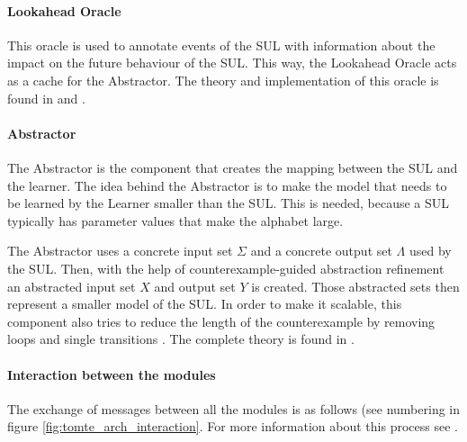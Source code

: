\documentclass[multi,crop=false,class=article]{standalone}
\begin{document}
\paragraph{Lookahead Oracle} This oracle is used to annotate events of the SUL
with information about the impact on the future behaviour of the SUL. This way,
the Lookahead Oracle acts as a cache for the Abstractor. The theory and
implementation of this oracle is found in \cite[p. 170]{Aarts2014} and 
\cite[p. 105]{Tomte2014}.

\paragraph{Abstractor} The Abstractor is the component that creates the mapping
between the SUL and the learner. The idea behind the Abstractor is to make the 
model that needs to be learned by the Learner smaller than the SUL. This is 
needed, because a SUL typically has parameter values that make the alphabet 
large.

The Abstractor uses a concrete input set $\Sigma$ and a concrete 
output set $\Lambda$ used by the SUL. Then, with the help of  
counterexample-guided abstraction refinement\cite[p. 104]{Tomte2014} an 
abstracted input set $X$ and output set $Y$ is created. Those abstracted sets 
then represent a smaller model of the SUL. In order to make it scalable, this 
component also tries to reduce the length of the counterexample by removing 
loops and single transitions \cite{Koopman2014}. The complete theory is found 
in \cite{Tomte2014}.

\paragraph{Interaction between the modules} The exchange of messages between
all the modules is as follows (see numbering in figure
\ref{fig:tomte_arch_interaction}. For more information about this process see 
\cite{Aarts2015,Tomte2014}.
\end{document}
